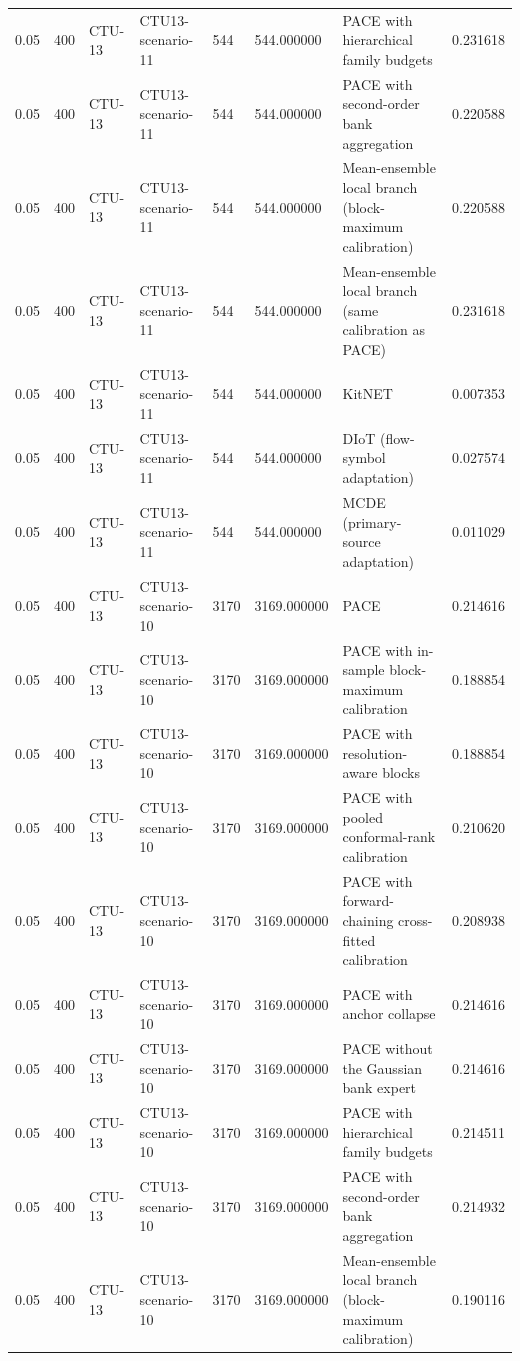 \begin{tabular}{llllllll}
0.05 & 400 & CTU-13 & CTU13-scenario-11 & 544 & 544.000000 & PACE with hierarchical family budgets & 0.231618 \\
0.05 & 400 & CTU-13 & CTU13-scenario-11 & 544 & 544.000000 & PACE with second-order bank aggregation & 0.220588 \\
0.05 & 400 & CTU-13 & CTU13-scenario-11 & 544 & 544.000000 & Mean-ensemble local branch (block-maximum calibration) & 0.220588 \\
0.05 & 400 & CTU-13 & CTU13-scenario-11 & 544 & 544.000000 & Mean-ensemble local branch (same calibration as PACE) & 0.231618 \\
0.05 & 400 & CTU-13 & CTU13-scenario-11 & 544 & 544.000000 & KitNET & 0.007353 \\
0.05 & 400 & CTU-13 & CTU13-scenario-11 & 544 & 544.000000 & DIoT (flow-symbol adaptation) & 0.027574 \\
0.05 & 400 & CTU-13 & CTU13-scenario-11 & 544 & 544.000000 & MCDE (primary-source adaptation) & 0.011029 \\
0.05 & 400 & CTU-13 & CTU13-scenario-10 & 3170 & 3169.000000 & PACE & 0.214616 \\
0.05 & 400 & CTU-13 & CTU13-scenario-10 & 3170 & 3169.000000 & PACE with in-sample block-maximum calibration & 0.188854 \\
0.05 & 400 & CTU-13 & CTU13-scenario-10 & 3170 & 3169.000000 & PACE with resolution-aware blocks & 0.188854 \\
0.05 & 400 & CTU-13 & CTU13-scenario-10 & 3170 & 3169.000000 & PACE with pooled conformal-rank calibration & 0.210620 \\
0.05 & 400 & CTU-13 & CTU13-scenario-10 & 3170 & 3169.000000 & PACE with forward-chaining cross-fitted calibration & 0.208938 \\
0.05 & 400 & CTU-13 & CTU13-scenario-10 & 3170 & 3169.000000 & PACE with anchor collapse & 0.214616 \\
0.05 & 400 & CTU-13 & CTU13-scenario-10 & 3170 & 3169.000000 & PACE without the Gaussian bank expert & 0.214616 \\
0.05 & 400 & CTU-13 & CTU13-scenario-10 & 3170 & 3169.000000 & PACE with hierarchical family budgets & 0.214511 \\
0.05 & 400 & CTU-13 & CTU13-scenario-10 & 3170 & 3169.000000 & PACE with second-order bank aggregation & 0.214932 \\
0.05 & 400 & CTU-13 & CTU13-scenario-10 & 3170 & 3169.000000 & Mean-ensemble local branch (block-maximum calibration) & 0.190116 \\

\end{tabular}

